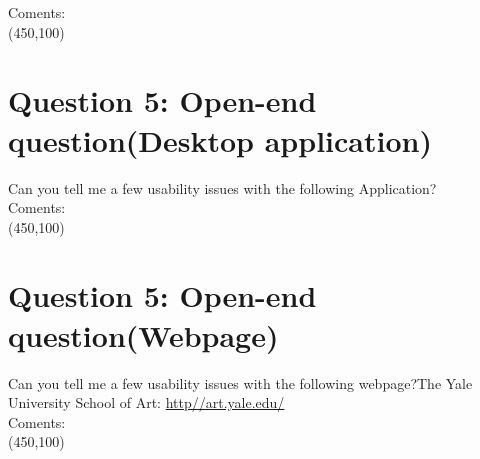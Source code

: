 \documentclass[12pt,a4paper,norsk]{article}
\begin{document}
\noindent Coments:\\
\framebox(450,100){}\\

\section {Question 5: Open-end question(Desktop application)} Can you tell me a few usability issues with the following Application?\\

\noindent Coments:\\
\framebox(450,100){}\\

\section {Question 5: Open-end question(Webpage)} Can you tell me a few usability issues with the following webpage?The Yale University School of Art: \url{http//art.yale.edu/} \\

\noindent Coments:\\
\framebox(450,100){}\\
\end{document}
